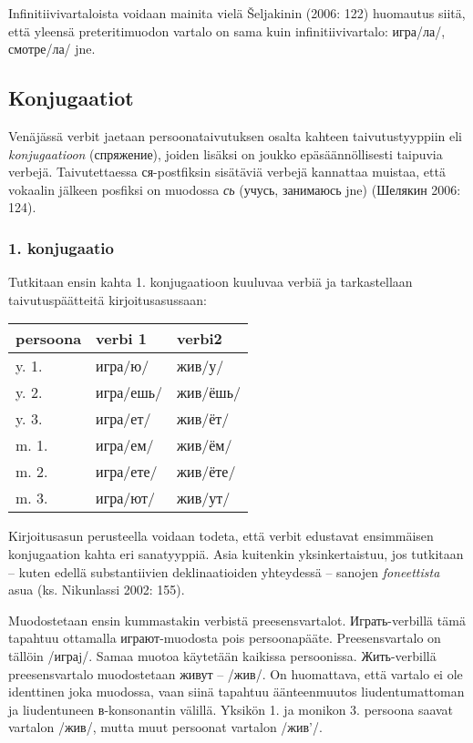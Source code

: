 \documentclass[]{scrartcl}
\begin{document}
Infinitiivivartaloista voidaan mainita vielä Šeljakinin (2006: 122)
huomautus siitä, että yleensä preteritimuodon vartalo on sama kuin
infinitiivivartalo: игра/ла/, смотре/ла/ jne.

\subsection{Konjugaatiot}\label{konjugaatiot}

Venäjässä verbit jaetaan persoonataivutuksen osalta kahteen
taivutustyyppiin eli \emph{konjugaatioon} (спряжение), joiden lisäksi on
joukko epäsäännöllisesti taipuvia verbejä. Taivutettaessa ся-postfiksin
sisätäviä verbejä kannattaa muistaa, että vokaalin jälkeen posfiksi on
muodossa \emph{сь} (учусь, занимаюсь jne) (Шелякин 2006: 124).

\subsubsection{1. konjugaatio}\label{konjugaatio}

Tutkitaan ensin kahta 1. konjugaatioon kuuluvaa verbiä ja tarkastellaan
taivutuspäätteitä kirjoitusasussaan:

\begin{longtable}[c]{@{}lll@{}}
\toprule
persoona & verbi 1 & verbi2\tabularnewline
\midrule
\endhead
y. 1. & игра/ю/ & жив/у/\tabularnewline
y. 2. & игра/ешь/ & жив/ёшь/\tabularnewline
y. 3. & игра/ет/ & жив/ёт/\tabularnewline
m. 1. & игра/ем/ & жив/ём/\tabularnewline
m. 2. & игра/ете/ & жив/ёте/\tabularnewline
m. 3. & игра/ют/ & жив/ут/\tabularnewline
\bottomrule
\end{longtable}

Kirjoitusasun perusteella voidaan todeta, että verbit edustavat
ensimmäisen konjugaation kahta eri sanatyyppiä. Asia kuitenkin
yksinkertaistuu, jos tutkitaan -- kuten edellä substantiivien
deklinaatioiden yhteydessä -- sanojen \emph{foneettista} asua (ks.
Nikunlassi 2002: 155).

Muodostetaan ensin kummastakin verbistä preesensvartalot.
Играть-verbillä tämä tapahtuu ottamalla играют-muodosta pois
persoonapääte. Preesensvartalo on tällöin /играj/. Samaa muotoa
käytetään kaikissa persoonissa. Жить-verbillä preesensvartalo
muodostetaan живут -- /жив/. On huomattava, että vartalo ei ole
identtinen joka muodossa, vaan siinä tapahtuu äänteenmuutos
liudentumattoman ja liudentuneen в-konsonantin välillä. Yksikön 1. ja
monikon 3. persoona saavat vartalon /жив/, mutta muut persoonat vartalon
/жив'/.
\end{document}
